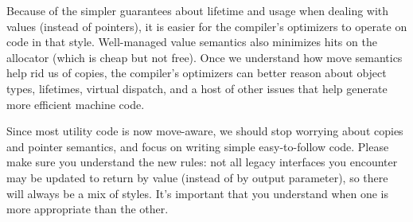 Because of the simpler guarantees about lifetime and usage when dealing with values (instead of pointers), it is easier for the compiler’s optimizers to operate on code in that style. Well-managed value semantics also minimizes hits on the allocator (which is cheap but not free). Once we understand how move semantics help rid us of copies, the compiler’s optimizers can better reason about object types, lifetimes, virtual dispatch, and a host of other issues that help generate more efficient machine code.

Since most utility code is now move-aware, we should stop worrying about copies and pointer semantics, and focus on writing simple easy-to-follow code. Please make sure you understand the new rules: not all legacy interfaces you encounter may be updated to return by value (instead of by output parameter), so there will always be a mix of styles. It’s important that you understand when one is more appropriate than the other.



